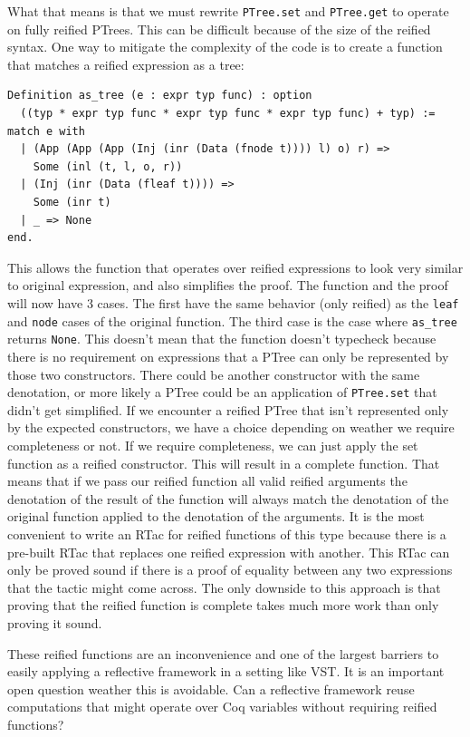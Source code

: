 \documentclass{puthesis}
\begin{document}
What that means is that we must rewrite \lstinline|PTree.set| and
\lstinline|PTree.get| to operate on fully reified PTrees. This can be
difficult because of the size of the reified syntax. One way to
mitigate the complexity of the code is to create a function that
matches a reified expression as a tree:

\begin{lstlisting}
Definition as_tree (e : expr typ func) : option
  ((typ * expr typ func * expr typ func * expr typ func) + typ) := 
match e with
  | (App (App (App (Inj (inr (Data (fnode t)))) l) o) r) =>
    Some (inl (t, l, o, r))
  | (Inj (inr (Data (fleaf t)))) =>
    Some (inr t)
  | _ => None
end.
\end{lstlisting}

This allows the function that operates over reified expressions to look very
similar to original expression, and also simplifies the proof. The function
and the proof will now have 3 cases. The first have the same behavior (only reified)
as the \lstinline|leaf| and \lstinline|node| cases of the original function. The third
case is the case where \lstinline|as_tree| returns \lstinline|None|. This doesn't
mean that the function doesn't typecheck because there is no requirement on 
expressions that a PTree can only be represented by those two constructors. There
could be another constructor with the same denotation, or more likely a PTree
could be an application of \lstinline|PTree.set| that didn't get simplified.
If we encounter a reified PTree that isn't represented
only by the expected constructors, we have a choice depending on
weather we require completeness or not. If we require completeness,
we can just apply the set function as a reified constructor. This
will result in a complete function. That means that if we
pass our reified function all valid reified arguments
the denotation of the result of the function will always
match the denotation of the original function applied
to the denotation of the arguments. It is the most convenient
to write an RTac for reified functions of this type because
there is a pre-built RTac that replaces one reified expression
with another. This RTac can only be proved sound if there is a proof
of equality between any two expressions that the tactic might come
across. The only downside to this approach is that proving that the
reified function is complete takes much more work than only proving it
sound. 

These reified functions are an inconvenience and one of the largest
barriers to easily applying a reflective framework in a setting like
VST. It is an important open question weather this is avoidable. Can
a reflective framework reuse computations that might operate
over Coq variables without requiring reified functions? 
\end{document}
